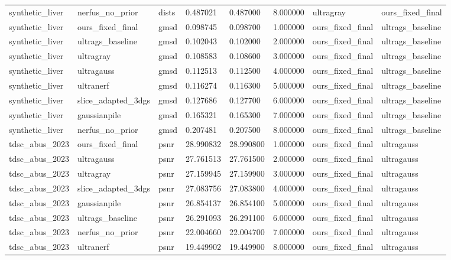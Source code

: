 \begin{tabular}{llllllll}
synthetic\_liver & nerfus\_no\_prior & dists & 0.487021 & 0.487000 & 8.000000 & ultragray & ours\_fixed\_final \\
synthetic\_liver & ours\_fixed\_final & gmsd & 0.098745 & 0.098700 & 1.000000 & ours\_fixed\_final & ultrags\_baseline \\
synthetic\_liver & ultrags\_baseline & gmsd & 0.102043 & 0.102000 & 2.000000 & ours\_fixed\_final & ultrags\_baseline \\
synthetic\_liver & ultragray & gmsd & 0.108583 & 0.108600 & 3.000000 & ours\_fixed\_final & ultrags\_baseline \\
synthetic\_liver & ultragauss & gmsd & 0.112513 & 0.112500 & 4.000000 & ours\_fixed\_final & ultrags\_baseline \\
synthetic\_liver & ultranerf & gmsd & 0.116274 & 0.116300 & 5.000000 & ours\_fixed\_final & ultrags\_baseline \\
synthetic\_liver & slice\_adapted\_3dgs & gmsd & 0.127686 & 0.127700 & 6.000000 & ours\_fixed\_final & ultrags\_baseline \\
synthetic\_liver & gaussianpile & gmsd & 0.165321 & 0.165300 & 7.000000 & ours\_fixed\_final & ultrags\_baseline \\
synthetic\_liver & nerfus\_no\_prior & gmsd & 0.207481 & 0.207500 & 8.000000 & ours\_fixed\_final & ultrags\_baseline \\
tdsc\_abus\_2023 & ours\_fixed\_final & psnr & 28.990832 & 28.990800 & 1.000000 & ours\_fixed\_final & ultragauss \\
tdsc\_abus\_2023 & ultragauss & psnr & 27.761513 & 27.761500 & 2.000000 & ours\_fixed\_final & ultragauss \\
tdsc\_abus\_2023 & ultragray & psnr & 27.159945 & 27.159900 & 3.000000 & ours\_fixed\_final & ultragauss \\
tdsc\_abus\_2023 & slice\_adapted\_3dgs & psnr & 27.083756 & 27.083800 & 4.000000 & ours\_fixed\_final & ultragauss \\
tdsc\_abus\_2023 & gaussianpile & psnr & 26.854137 & 26.854100 & 5.000000 & ours\_fixed\_final & ultragauss \\
tdsc\_abus\_2023 & ultrags\_baseline & psnr & 26.291093 & 26.291100 & 6.000000 & ours\_fixed\_final & ultragauss \\
tdsc\_abus\_2023 & nerfus\_no\_prior & psnr & 22.004660 & 22.004700 & 7.000000 & ours\_fixed\_final & ultragauss \\
tdsc\_abus\_2023 & ultranerf & psnr & 19.449902 & 19.449900 & 8.000000 & ours\_fixed\_final & ultragauss \\

\end{tabular}
